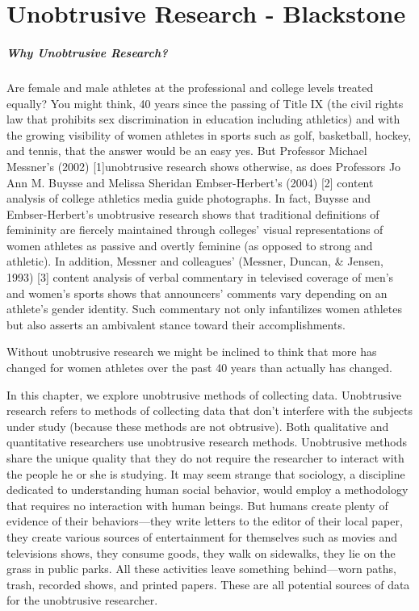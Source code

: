 \chapter{Unobtrusive Research - Blackstone}\label{ch12:unobtrusive_research}

\paragraph{Why Unobtrusive Research?}

Are female and male athletes at the professional and college levels treated equally? You might think, 40 years since the passing of Title IX (the civil rights law that prohibits sex discrimination in education including athletics) and with the growing visibility of women athletes in sports such as golf, basketball, hockey, and tennis, that the answer would be an easy yes. But Professor Michael Messner’s (2002) [1]unobtrusive research shows otherwise, as does Professors Jo Ann M. Buysse and Melissa Sheridan Embser-Herbert’s (2004) [2] content analysis of college athletics media guide photographs. In fact, Buysse and Embser-Herbert’s unobtrusive research shows that traditional definitions of femininity are fiercely maintained through colleges’ visual representations of women athletes as passive and overtly feminine (as opposed to strong and athletic). In addition, Messner and colleagues’ (Messner, Duncan, \& Jensen, 1993) [3] content analysis of verbal commentary in televised coverage of men’s and women’s sports shows that announcers’ comments vary depending on an athlete’s gender identity. Such commentary not only infantilizes women athletes but also asserts an ambivalent stance toward their accomplishments.

Without unobtrusive research we might be inclined to think that more has changed for women athletes over the past 40 years than actually has changed.

In this chapter, we explore unobtrusive methods of collecting data. Unobtrusive research refers to methods of collecting data that don’t interfere with the subjects under study (because these methods are not obtrusive). Both qualitative and quantitative researchers use unobtrusive research methods. Unobtrusive methods share the unique quality that they do not require the researcher to interact with the people he or she is studying. It may seem strange that sociology, a discipline dedicated to understanding human social behavior, would employ a methodology that requires no interaction with human beings. But humans create plenty of evidence of their behaviors—they write letters to the editor of their local paper, they create various sources of entertainment for themselves such as movies and televisions shows, they consume goods, they walk on sidewalks, they lie on the grass in public parks. All these activities leave something behind—worn paths, trash, recorded shows, and printed papers. These are all potential sources of data for the unobtrusive researcher.

